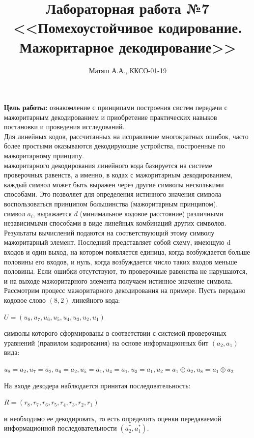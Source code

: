 \documentclass[11pt]{article}
\title{\textbf{Лабораторная работа №7\\
<<Помехоустойчивое кодирование. Мажоритарное декодирование>>}}
\author{Матяш А.А., ККСО-01-19}
\date{}
\begin{document}
\maketitle
\thispagestyle{empty}
\textbf{Цель работы:} ознакомление с принципами построения систем передачи с мажоритарным декодированием и приобретение практических навыков постановки и проведения исследований.\\
Для линейных кодов, рассчитанных на исправление многократных ошибок, часто более простыми оказываются декодирующие устройства, построенные по мажоритарному принципу.\\ 
 мажоритарного декодирования линейного кода базируется на системе проверочных равенств, а именно, в кодах с мажоритарным декодированием, каждый символ может быть выражен через другие символы несколькими способами. Это позволяет для определения истинного значения символа воспользоваться принципом большинства (мажоритарным принципом).\\
 символ $a_{i}$, выражается $d$ (минимальное кодовое расстояние) различными независимыми способами в виде линейных комбинаций других символов. Результаты вычислений подаются на соответствующий этому символу мажоритарный элемент. Последний представляет собой схему, имеющую d входов и один выход, на котором появляется единица, когда возбуждается больше половины его входов, и нуль, когда возбуждается число таких входов меньше половины. Если ошибки отсутствуют, то проверочные равенства не нарушаются, и на выходе мажоритарного элемента получаем истинное значение символа. Рассмотрим процесс мажоритарного декодирования на примере. Пусть передано кодовое слово $(8,2)$ линейного кода:\\
\begin{center}
    $U = (u_{8}, u_{7}, u_{6}, u_{5}, u_{4}, u_{3}, u_{2}, u_{1})$
\end{center}
символы которого сформированы в соответствии с системой проверочных уравнений (правилом кодирования) на основе информационных бит $(a_{2},a_{1})$ вида:
\begin{center}
    $u_{8} = a_{2}, u_{7} = a_{2}, u_{6} = a_{2}, u_{5} = a_{1}, u_{4} = a_{1}, u_{3} = a_{1}, u_{2} = a_{1} \oplus a_{2}, u_{8} = a_{1} \oplus a_{2}$
\end{center}
На входе декодера наблюдается принятая последовательность:
\begin{center}
    $R = (r_{8}, r_{7}, r_{6}, r_{5}, r_{4}, r_{3}, r_{2}, r_{1})$
\end{center}
и необходимо ее декодировать, то есть определить оценки передаваемой информационной последовательности $(a_{2}^{*},a_{1}^{*})$.\\
\end{document}
